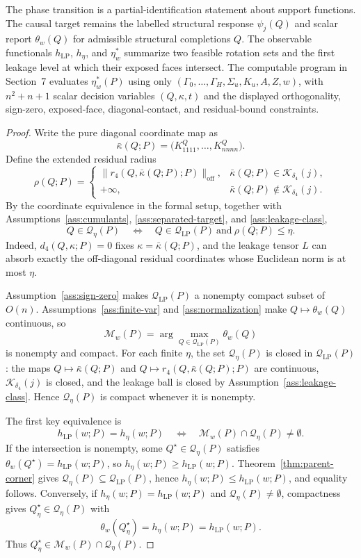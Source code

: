 The phase transition is a partial-identification statement about support functions.  The causal target remains the labelled structural response \(\psi_j(Q)\) and scalar report \(\theta_w(Q)\) for admissible structural completions \(Q\).  The observable functionals \(h_{\mathrm{LP}}\), \(h_\eta\), and \(\eta_w^*\) summarize two feasible rotation sets and the first leakage level at which their exposed faces intersect.  The computable program in Section~7 evaluates \(\eta_w^*(P)\) using only \((\Gamma_0,\ldots,\Gamma_H,\Sigma_u,K_u,A,Z,w)\), with \(n^2+n+1\) scalar decision variables \((Q,\kappa,t)\) and the displayed orthogonality, sign-zero, exposed-face, diagonal-contact, and residual-bound constraints.

\begin{proof}
Write the pure diagonal coordinate map as
\[
\bar\kappa(Q;P)=\bigl(K^Q_{1111},\ldots,K^Q_{nnnn}\bigr).
\]
Define the extended residual radius
\[
\rho(Q;P)=
\begin{cases}
\|r_4(Q,\bar\kappa(Q;P);P)\|_{\mathrm{off}},
& \bar\kappa(Q;P)\in\mathcal K_{\delta_4}(j),\\
+\infty,
& \bar\kappa(Q;P)\notin\mathcal K_{\delta_4}(j).
\end{cases}
\]
By the coordinate equivalence in the formal setup, together with Assumptions~\ref{ass:cumulants}, \ref{ass:separated-target}, and \ref{ass:leakage-class},
\[
Q\in\mathcal Q_\eta(P)
\quad\Longleftrightarrow\quad
Q\in\mathcal Q_{\mathrm{LP}}(P)\ \text{and}\ \rho(Q;P)\le\eta .
\]
Indeed, \(d_4(Q,\kappa;P)=0\) fixes \(\kappa=\bar\kappa(Q;P)\), and the leakage tensor \(L\) can absorb exactly the off-diagonal residual coordinates whose Euclidean norm is at most \(\eta\).

Assumption~\ref{ass:sign-zero} makes \(\mathcal Q_{\mathrm{LP}}(P)\) a nonempty compact subset of \(O(n)\).  Assumptions~\ref{ass:finite-var} and \ref{ass:normalization} make \(Q\mapsto\theta_w(Q)\) continuous, so
\[
\mathcal M_w(P)=\arg\max_{Q\in\mathcal Q_{\mathrm{LP}}(P)}\theta_w(Q)
\]
is nonempty and compact.  For each finite \(\eta\), the set \(\mathcal Q_\eta(P)\) is closed in \(\mathcal Q_{\mathrm{LP}}(P)\): the maps \(Q\mapsto\bar\kappa(Q;P)\) and \(Q\mapsto r_4(Q,\bar\kappa(Q;P);P)\) are continuous, \(\mathcal K_{\delta_4}(j)\) is closed, and the leakage ball is closed by Assumption~\ref{ass:leakage-class}.  Hence \(\mathcal Q_\eta(P)\) is compact whenever it is nonempty.

The first key equivalence is
\[
h_{\mathrm{LP}}(w;P)=h_\eta(w;P)
\quad\Longleftrightarrow\quad
\mathcal M_w(P)\cap\mathcal Q_\eta(P)\ne\emptyset .
\]
If the intersection is nonempty, some \(Q^\star\in\mathcal Q_\eta(P)\) satisfies \(\theta_w(Q^\star)=h_{\mathrm{LP}}(w;P)\), so \(h_\eta(w;P)\ge h_{\mathrm{LP}}(w;P)\).  Theorem~\ref{thm:parent-corner} gives \(\mathcal Q_\eta(P)\subseteq\mathcal Q_{\mathrm{LP}}(P)\), hence \(h_\eta(w;P)\le h_{\mathrm{LP}}(w;P)\), and equality follows.  Conversely, if \(h_\eta(w;P)=h_{\mathrm{LP}}(w;P)\) and \(\mathcal Q_\eta(P)\ne\emptyset\), compactness gives \(Q_\eta^\star\in\mathcal Q_\eta(P)\) with
\[
\theta_w(Q_\eta^\star)=h_\eta(w;P)=h_{\mathrm{LP}}(w;P).
\]
Thus \(Q_\eta^\star\in\mathcal M_w(P)\cap\mathcal Q_\eta(P)\).


\end{proof}
